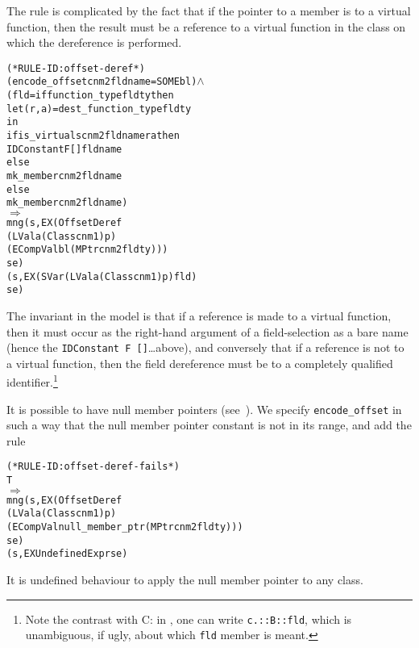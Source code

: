 \documentclass[11pt]{article}
\begin{document}
The rule is complicated by the fact that if the pointer to a member is
to a virtual function, then the result must be a reference to a
virtual function in the class on which the dereference is
performed.
%
\begin{alltt}
(* RULE-ID: offset-deref *)
     (encode_offset cnm2 fldname = SOME bl) \(\land\)
     (fld = if function_type fldty then
              let (r,a) = dest_function_type fldty
              in
                if is_virtual s cnm2 fldname r a then
                  IDConstant F [] fldname
                else
                  mk_member cnm2 fldname
            else
              mk_member cnm2 fldname)
   \(\Rightarrow\)
     mng (s, EX (OffsetDeref
                     (LVal a (Class cnm1) p)
                     (ECompVal bl (MPtr cnm2 fldty)))
                se)
         (s, EX (SVar (LVal a (Class cnm1) p) fld)
                se)
\end{alltt}
The invariant in the model is that if a reference is made to a virtual
function, then it must occur as the right-hand argument of a
field-selection as a bare name (hence the
\texttt{IDConstant~F~[]}\dots above), and conversely that if a
reference is not to a virtual function, then the field dereference
must be to a completely qualified identifier.\footnote{Note the
  contrast with C: in \cpp, one can write \texttt{c.::B::fld}, which
  is unambiguous, if ugly, about which \texttt{fld} member is meant.}

It is possible to have null member pointers
(see~\cite[\S4.11]{cpp-standard-iso14882}).  We specify
\texttt{encode_offset} in such a way that the null member pointer
constant is not in its range, and add the rule
%
\begin{center}
\begin{minipage}{\textwidth}
\begin{alltt}
(* RULE-ID: offset-deref-fails *)
     T
   \(\Rightarrow\)
     mng (s, EX (OffsetDeref
                   (LVal a (Class cnm1) p)
                   (ECompVal null_member_ptr (MPtr cnm2 fldty)))
                se)
         (s, EX UndefinedExpr se)
\end{alltt}
\end{minipage}
\end{center}
It is undefined behaviour to apply the null member pointer to any
class.
\end{document}
